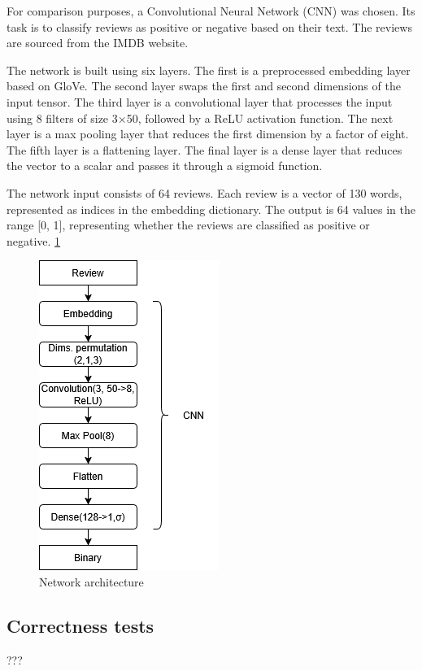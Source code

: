 \documentclass[conference]{IEEEtran}
\begin{document}
For comparison purposes, a Convolutional Neural Network (CNN) was chosen. Its task is to classify reviews as positive or negative based on their text. The reviews are sourced from the IMDB website.

The network is built using six layers. The first is a preprocessed embedding layer based on GloVe. The second layer swaps the first and second dimensions of the input tensor. The third layer is a convolutional layer that processes the input using 8 filters of size 3×50, followed by a ReLU activation function. The next layer is a max pooling layer that reduces the first dimension by a factor of eight. The fifth layer is a flattening layer. The final layer is a dense layer that reduces the vector to a scalar and passes it through a sigmoid function.

The network input consists of 64 reviews. Each review is a vector of 130 words, represented as indices in the embedding dictionary. The output is 64 values in the range [0, 1], representing whether the reviews are classified as positive or negative. \ref{fig:Network_architecture}

\begin{figure}
    \centering
    \includegraphics[height=0.9\linewidth]{Network.png}
    \caption{Network architecture}
    \label{fig:Network_architecture}
\end{figure}

\subsection{Correctness tests}
???
\end{document}
